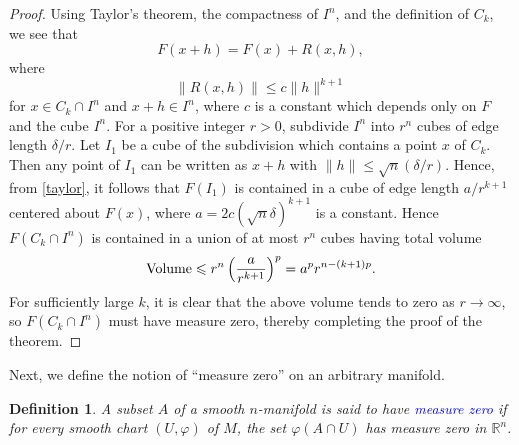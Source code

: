 \documentclass[11pt]{article}
\theoremstyle{thmstyle}
\theoremstyle{defstyle}
\newtheorem{definition}[theorem]{Definition}
\newcommand{\R}{\mathbb{R}}
\newcommand{\define}[1]{\textcolor{blue}{\textit{#1}}}
\renewcommand{\le}{\leqslant}
\begin{document}
\begin{proof}
	Using Taylor's theorem, the compactness of $I^n$, and the definition of $C_k$, we see that 
	\begin{equation}
		F(x + h) = F(x) + R(x, h),\label{taylor}
	\end{equation}
	where 
	\begin{equation*}
		\|R(x, h)\|\le c\|h\|^{k + 1}
	\end{equation*}
	for $x\in C_k\cap I^n$ and $x+h\in I^n$, where $c$ is a constant which depends only on $F$ and the cube $I^n$. For a positive integer $r > 0$, subdivide $I^n$ into $r^n$ cubes of edge length $\delta/r$. Let $I_1$ be a cube of the subdivision which contains a point $x$ of $C_k$. Then any point of $I_1$ can be written as $x + h$ with $\|h\|\le\sqrt{n}\left(\delta/r\right)$. Hence, from \eqref{taylor}, it follows that $F(I_1)$ is contained in a cube of edge length $a/r^{k + 1}$ centered about $F(x)$, where $a = 2c\left(\sqrt n\delta\right)^{k + 1}$ is a constant. Hence $F(C_k\cap I^n)$ is contained in a union of at most $r^n$ cubes having total volume 
	\begin{equation*}
		{\rm Volume }\le r^n\left(\frac{a}{r^{k + 1}}\right)^p = a^p r^{n - (k + 1)p}.
	\end{equation*}
	For sufficiently large $k$, it is clear that the above volume tends to zero as $r\to\infty$, so $F(C_k\cap I^n)$ must have measure zero, thereby completing the proof of the theorem.
\end{proof}

Next, we define the notion of ``measure zero'' on an arbitrary manifold.

\begin{definition}
	A subset $A$ of a smooth $n$-manifold is said to have \define{measure zero} if for every smooth chart $(U,\varphi)$ of $M$, the set $\varphi(A\cap U)$ has measure zero in $\R^n$.
\end{definition}
\end{document}
